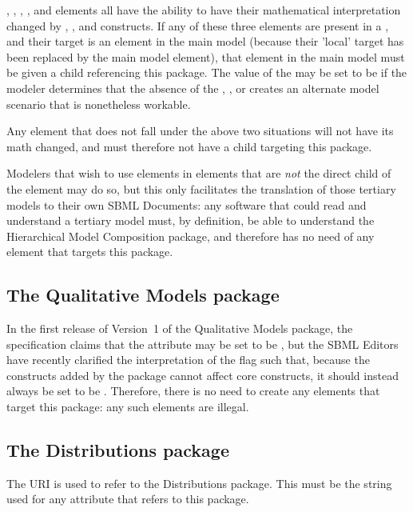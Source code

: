 \Compartment, \Parameter, \Reaction, \Species, and \SpeciesReference elements all have the ability to have their mathematical interpretation changed by \InitialAssignment, \Rule, and \Event constructs.  If any of these three elements are present in a \Submodel, and their target is an element in the main model (because their 'local' target has been replaced by the main model element), that element in the main model must be given a \ChangedMath child referencing this package.  The value of the  may be set to be  if the modeler determines that the absence of the \InitialAssignment, \Rule, or \Event creates an alternate model scenario that is nonetheless workable.

Any element that does not fall under the above two situations will not have its math changed, and must therefore not have a \ChangedMath child targeting this package.

Modelers that wish to use \ChangedMath elements in \Model elements that are \emph{not} the direct child of the  element may do so, but this only facilitates the translation of those tertiary models to their own SBML Documents:  any software that could read and understand a tertiary model must, by definition, be able to understand the Hierarchical Model Composition package, and therefore has no need of any \ChangedMath element that targets this package.


\subsection{The Qualitative Models package}

In the first release of Version~1 of the Qualitative Models package, the specification claims that the  attribute may be set to be , but the SBML Editors have recently clarified the interpretation of the  flag such that, because the constructs added by the package cannot affect core constructs, it should instead always be set to be .  Therefore, there is no need to create any \ChangedMath elements that target this package:  any such elements are illegal.


\subsection{The Distributions package}

The URI  is used to refer to the Distributions package.  This must be the string used for any  attribute that refers to this package.

